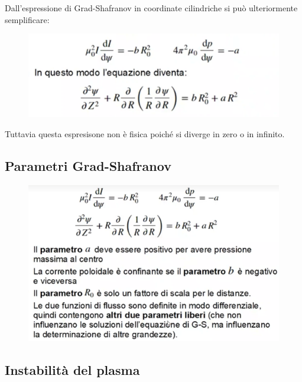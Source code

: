 \documentclass{article}
\begin{document}
Dall'espressione di Grad-Shafranov in coordinate cilindriche si può ulteriormente semplificare:
\begin{figure}
    \includegraphics[scale=0.4]{2022-06-26-16-38-00.png}%
\end{figure}
Tuttavia questa espresisone non è fisica poiché si diverge in zero o in infinito.
\subsection{Parametri Grad-Shafranov}
\begin{figure}
    \centering
    \includegraphics[scale=0.4]{2022-06-26-16-40-19.png}%
\end{figure}
\subsection{Instabilità del plasma}
\end{document}

